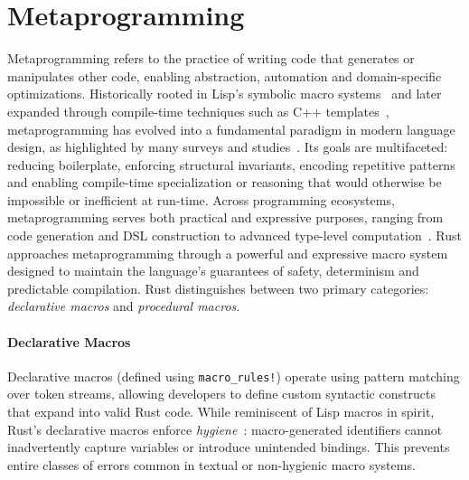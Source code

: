 \section{Metaprogramming}\label{sec:metaprogramming}
Metaprogramming refers to the practice of writing code that generates or manipulates other code, enabling abstraction, automation and domain-specific optimizations.
Historically rooted in Lisp's symbolic macro systems~\cite{McCarthy60} and later expanded through compile-time techniques such as C++ templates~\cite{Vandevoorde02}, metaprogramming has evolved into a fundamental paradigm in modern language design, as highlighted by many surveys and studies~\cite{MetaprogrammingLanguagesSurvey19, DSLMetaProgramming08}.
Its goals are multifaceted: reducing boilerplate, enforcing structural invariants, encoding repetitive patterns and enabling compile-time specialization or reasoning that would otherwise be impossible or inefficient at run-time.
Across programming ecosystems, metaprogramming serves both practical and expressive purposes, ranging from code generation and DSL construction to advanced type-level computation~\cite{DSLMetaProgramming08, MetaprogrammingUr10}.
Rust approaches metaprogramming through a powerful and expressive macro system designed to maintain the language's guarantees of safety, determinism and predictable compilation.
Rust distinguishes between two primary categories: \textit{declarative macros} and \textit{procedural macros}.

\paragraph{Declarative Macros}
Declarative macros (defined using \texttt{macro\_rules!}) operate using pattern matching over token streams, allowing developers to define custom syntactic constructs that expand into valid Rust code.
While reminiscent of Lisp macros in spirit, Rust's declarative macros enforce \textit{hygiene}~\cite{HygienicMacros92,Kohlbecker1986HygienicME,Clinger2020HygienicMT}: macro-generated identifiers cannot inadvertently capture variables or introduce unintended bindings.
This prevents entire classes of errors common in textual or non-hygienic macro systems.

